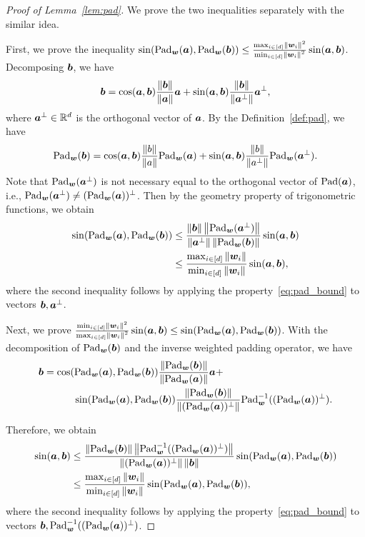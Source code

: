 \documentclass[lettersize,journal]{IEEEtran}
\theoremstyle{definition}
\theoremstyle{definition}
\begin{document}
\begin{proof}[Proof of Lemma~\ref{lem:pad}] We prove the two inequalities separately with the similar idea.

First, we prove the inequality $\sin(\text{Pad}_{\bm{w}}(\bm{a}),  \text{Pad}_{\bm{w}}(\bm{b})) \leq \frac{ \max_{i \in [d]} \left\lVert\bm{w}_i\right\rVert^2 }{\min_{i \in [d]} \left\lVert\bm{w}_i\right\rVert^2} \sin (\bm{a}, \bm{b})$. Decomposing $\bm{b}$, we have
\begin{equation}
    \bm{b} = \cos (\bm{a}, \bm{b}) \frac{\left\lVert\bm{b}\right\rVert}{\left\lVert\bm{a}\right\rVert} \bm{a} + \sin (\bm{a}, \bm{b}) \frac{\left\lVert\bm{b}\right\rVert}{\left\lVert\bm{a}^{\perp}\right\rVert}\bm{a}^{\perp},
\end{equation}
where $\bm{a}^{\perp} \in \mathbb{R}^d$ is the orthogonal vector of $\bm{a}$. By the Definition~\ref{def:pad}, we have 
\begin{equation}\label{eq:pad_second_ineq}
    \pad_{\mw}(\mb) = \cos (\ma, \mb) \frac{\onorm{b}}{\onorm{a}} \pad_{\mw}(\ma) + \sin (\ma, \mb) \frac{\onorm{b}}{\onorm{a^{\perp}}} \pad_{\mw}(\ma^{\perp}).
\end{equation}
Note that $\text{Pad}_{\bm{w}}(\bm{a}^{\perp})$ is not necessary equal to the orthogonal vector of $\text{Pad}(\bm{a})$, i.e., $\text{Pad}_{\bm{w}}(\bm{a}^{\perp}) \neq (\text{Pad}_{\bm{w}}(\bm{a}))^{\perp}$. Then by the geometry property of trigonometric functions, we obtain
\begin{align}
    \sin(\text{Pad}_{\bm{w}}(\bm{a}),  \text{Pad}_{\bm{w}}(\bm{b}))  &\leq \frac{  \left\lVert\bm{b}\right\rVert \left\lVert\text{Pad}_{\bm{w}}(\bm{a}^{\perp})\right\rVert }{ \left\lVert\bm{a}^{\perp}\right\rVert \left\lVert \text{Pad}_{\bm{w}}(\bm{b})\right\rVert} \sin (\bm{a}, \bm{b})  \\
    & \leq  \frac{ \max_{i \in [d]} \left\lVert\bm{w}_i\right\rVert }{\min_{i \in [d]} \left\lVert\bm{w}_i\right\rVert} \sin (\bm{a}, \bm{b}),
\end{align}
where the second inequality follows by applying the property~\eqref{eq:pad_bound} to vectors $\bm{b}, \bm{a}^{\perp}$. 

Next, we prove $\frac{\min_{i \in [d]} \left\lVert\bm{w}_i\right\rVert^2}{\max_{i \in [d]} \left\lVert\bm{w}_i\right\rVert^2 } \sin (\bm{a}, \bm{b}) \leq \sin(\text{Pad}_{\bm{w}}(\bm{a}),  \text{Pad}_{\bm{w}}(\bm{b}))$. With the decomposition of $\text{Pad}_{\bm{w}}(\bm{b})$ and the inverse weighted padding operator, we have 
\begin{align}
    \bm{b} &=  \cos(\text{Pad}_{\bm{w}}(\bm{a}), \text{Pad}_{\bm{w}}(\bm{b})) \frac{\left\lVert\text{Pad}_{\bm{w}}(\bm{b})\right\rVert}{\left\lVert\text{Pad}_{\bm{w}}(\bm{a})\right\rVert} \bm{a} +\\
    & \quad \quad \quad \sin(\text{Pad}_{\bm{w}}(\bm{a}), \text{Pad}_{\bm{w}}(\bm{b}))\frac{\left\lVert\text{Pad}_{\bm{w}}(\bm{b})\right\rVert}{\left\lVert(\text{Pad}_{\bm{w}}(\bm{a}))^{\perp}\right\rVert} \text{Pad}_{\bm{w}}^{-1}((\text{Pad}_{\bm{w}}(\bm{a}))^{\perp}).
\end{align}

Therefore, we obtain 
\begin{align}
    \sin(\bm{a}, \bm{b}) &\leq \frac{ \left\lVert\text{Pad}_{\bm{w}}(\bm{b}) \right\rVert \left\lVert\text{Pad}_{\bm{w}}^{-1}((\text{Pad}_{\bm{w}}(\bm{a}))^{\perp})  \right\rVert }{ \left\lVert(\text{Pad}_{\bm{w}}(\bm{a}))^{\perp} \right\rVert \left\lVert\bm{b}\right\rVert }  \sin(\text{Pad}_{\bm{w}}(\bm{a}), \text{Pad}_{\bm{w}}(\bm{b}))\\
    & \leq \frac{ \max_{i \in [d]} \left\lVert\bm{w}_i\right\rVert }{\min_{i \in [d]} \left\lVert\bm{w}_i\right\rVert} \sin(\text{Pad}_{\bm{w}}(\bm{a}), \text{Pad}_{\bm{w}}(\bm{b})),
\end{align}
where the second inequality follows by applying the property~\eqref{eq:pad_bound} to vectors $\bm{b}, \text{Pad}_{\bm{w}}^{-1}((\text{Pad}_{\bm{w}}(\bm{a}))^{\perp})$.


\end{proof}
\end{document}
